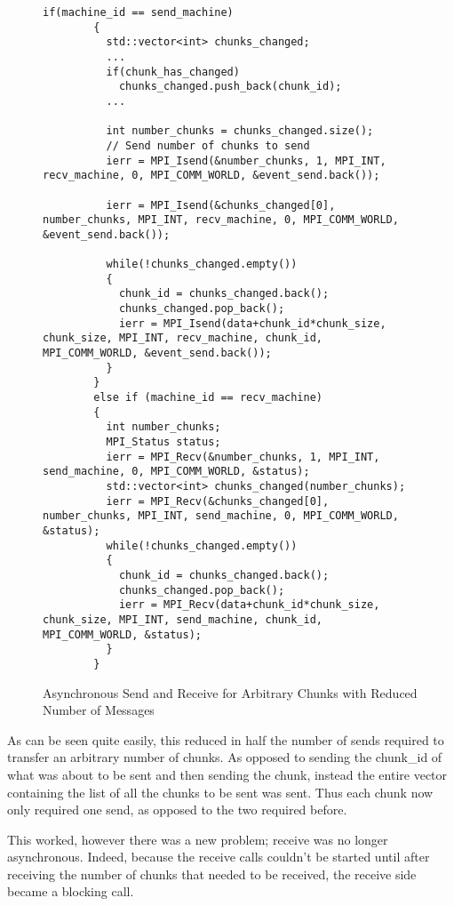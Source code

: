 \documentclass[../thesis.tex]{subfiles}
\begin{document}
    \begin{figure}[htbp]
      \centering
      \lstset{language=cpp}  
      \begin{lstlisting}[tabsize=2]
        if(machine_id == send_machine)
        {
          std::vector<int> chunks_changed;
          ...
          if(chunk_has_changed)
            chunks_changed.push_back(chunk_id);
          ...

          int number_chunks = chunks_changed.size();
          // Send number of chunks to send
          ierr = MPI_Isend(&number_chunks, 1, MPI_INT, recv_machine, 0, MPI_COMM_WORLD, &event_send.back());

          ierr = MPI_Isend(&chunks_changed[0], number_chunks, MPI_INT, recv_machine, 0, MPI_COMM_WORLD, &event_send.back());

          while(!chunks_changed.empty())
          {
            chunk_id = chunks_changed.back();
            chunks_changed.pop_back();
            ierr = MPI_Isend(data+chunk_id*chunk_size, chunk_size, MPI_INT, recv_machine, chunk_id, MPI_COMM_WORLD, &event_send.back());
          }
        }
        else if (machine_id == recv_machine)
        {
          int number_chunks;
          MPI_Status status;
          ierr = MPI_Recv(&number_chunks, 1, MPI_INT, send_machine, 0, MPI_COMM_WORLD, &status);
          std::vector<int> chunks_changed(number_chunks);
          ierr = MPI_Recv(&chunks_changed[0], number_chunks, MPI_INT, send_machine, 0, MPI_COMM_WORLD, &status);
          while(!chunks_changed.empty())
          {
            chunk_id = chunks_changed.back();
            chunks_changed.pop_back();
            ierr = MPI_Recv(data+chunk_id*chunk_size, chunk_size, MPI_INT, send_machine, chunk_id, MPI_COMM_WORLD, &status);
          }       
        }
        \end{lstlisting}

      \caption{Asynchronous Send and Receive for Arbitrary Chunks with Reduced Number of Messages}
      \label{fig:final_send_receive}
    \end{figure}


    As can be seen quite easily, this reduced in half the number of sends required to transfer an arbitrary number of chunks. As opposed to sending the chunk\_id of what was about to be sent and then sending the chunk, instead the entire vector containing the list of all the chunks to be sent was sent. Thus each chunk now only required one send, as opposed to the two required before.

    This worked, however there was a new problem; receive was no longer asynchronous. Indeed, because the receive calls couldn't be started until after receiving the number of chunks that needed to be received, the receive side became a blocking call.
\end{document}
